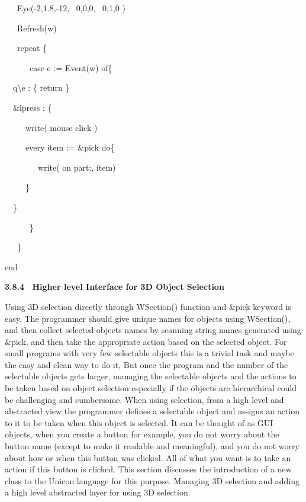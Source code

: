 \documentclass[letterpaper]{article}
\begin{document}
{\sffamily
\ \ \ Eye(-2,1.8,-12, \ 0,0,0, \ 0,1,0 )}

{\sffamily
\ \ \ Refresh(w)}

{\sffamily
\ \ \ repeat \{}

{\sffamily
\ \ \ \ \ \ case e := Event(w) of\{}

{\sffamily
\ \  {\textquotedbl}q{\textquotedbl}{\textbar}{\textquotedbl}{\textbackslash}e{\textquotedbl} : \{ return \}
\ \ \ \ \ \ \ \ \ \ \ \ \ \ \ \ \ }

{\sffamily
\ \  \&lpress : \{\ \  \ \ \ }

{\sffamily
\ \  \ \ \ write({\textquotedbl} mouse click{\textquotedbl} )}

{\sffamily
\ \  \ \ \ every item := \&pick do\{}

{\sffamily
\ \  \ \ \ \ \ \ write( {\textquotedbl}on part:{\textquotedbl}, item)}

{\sffamily
\ \  \ \ \ \}}

{\sffamily
\ \  \}}

{\sffamily
\ \ \ \ \ \ \}}

{\sffamily
\ \ \ \}}

{\sffamily
end}


\bigskip

{\bfseries
3.8.4 \ Higher level Interface for 3D Object Selection }


\bigskip

{
Using 3D selection directly through \textsf{WSection()} function and \textsf{\&}\textsf{pick} keyword is easy. The
programmer should give unique names for objects using \textsf{WSection}\textsf{()}, and then collect selected objects
names by scanning string names generated using \textsf{\&pick}, and then take the appropriate action based on the
selected object. For small programs with very few selectable objects this is a trivial task and maybe the easy and
clean way to do it, But once the program and the number of the selectable objects gets larger, managing the selectable
objects and the actions to be taken based on object selection especially if the objects are hierarchical could be
challenging and cumbersome. When using selection, from a high level and abstracted view the programmer defines a
selectable object and assigns an action to it to be taken when this object is selected. It can be thought of as GUI
objects, when you create a button for example, you do not worry about the button name (except to make it readable and
meaningful), and you do not worry about how or when this button was clicked. All of what you want is to take an action
if this button is clicked. This section discusses the introduction of a new class to the Unicon language for this
purpose. Managing 3D selection and adding a high level abstracted layer for using 3D selection.}
\end{document}
